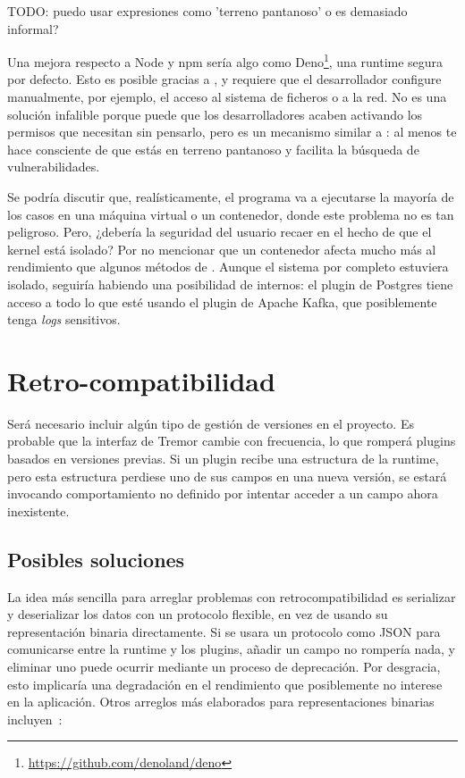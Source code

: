 TODO: puedo usar expresiones como 'terreno pantanoso' o es demasiado informal?

Una mejora respecto a Node y npm sería algo como
Deno\footnote{\url{https://github.com/denoland/deno}}, una runtime segura por
defecto. Esto es posible gracias a \sandboxing, y requiere que el desarrollador
configure manualmente, por ejemplo, el acceso al sistema de ficheros o a la red.
No es una solución infalible porque puede que los desarrolladores acaben
activando los permisos que necesitan sin pensarlo, pero es un mecanismo similar
a \unsafe: al menos te hace consciente de que estás en terreno pantanoso y
facilita la búsqueda de vulnerabilidades.

Se podría discutir que, realísticamente, el programa va a ejecutarse la mayoría
de los casos en una máquina virtual o un contenedor, donde este problema no es
tan peligroso. Pero, ¿debería la seguridad del usuario recaer en el hecho de que
el kernel está isolado? Por no mencionar que un contenedor afecta mucho más al
rendimiento que algunos métodos de \sandboxing. Aunque el sistema por completo
estuviera isolado, seguiría habiendo una posibilidad de \leaks internos: el
plugin de Postgres tiene acceso a todo lo que esté usando el plugin de Apache
Kafka, que posiblemente tenga \emph{logs} sensitivos.

\section{Retro-compatibilidad}\label{sec:compat}

Será necesario incluir algún tipo de gestión de versiones en el proyecto. Es
probable que la interfaz de Tremor cambie con frecuencia, lo que romperá plugins
basados en versiones previas. Si un plugin recibe una estructura de la runtime,
pero esta estructura perdiese uno de sus campos en una nueva versión, se estará
invocando comportamiento no definido por intentar acceder a un campo ahora
inexistente.

\subsection{Posibles soluciones}

La idea más sencilla para arreglar problemas con retrocompatibilidad es
serializar y deserializar los datos con un protocolo flexible, en vez de usando
su representación binaria directamente. Si se usara un protocolo como JSON para
comunicarse entre la runtime y los plugins, añadir un campo no rompería nada, y
eliminar uno puede ocurrir mediante un proceso de deprecación. Por desgracia,
esto implicaría una degradación en el rendimiento que posiblemente no interese
en la aplicación. Otros arreglos más elaborados para representaciones binarias
incluyen~\cite{swiftabi}:


